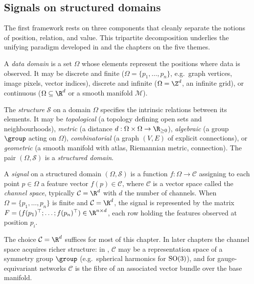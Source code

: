 \subsection{Signals on structured domains}
\label{sec:found:signals}

The first framework rests on three components that cleanly separate the notions
of position, relation, and value. This tripartite decomposition underlies the
unifying paradigm developed in  and the chapters on the five
themes.

\begin{definition}
\label{def:found:domain}
A \emph{data domain} is a set $\Omega$ whose elements represent the positions
where data is observed. It may be discrete and finite
($\Omega = \{p_1, \ldots, p_n\}$, e.g.\ graph vertices, image pixels, vector
indices), discrete and infinite ($\Omega = \Z^d$, an infinite grid), or
continuous ($\Omega \subseteq \R^d$ or a smooth manifold $\mathcal{M}$).
\end{definition}

\begin{definition}
\label{def:found:structure}
The \emph{structure} $\mathcal{S}$ on a domain $\Omega$ specifies the intrinsic
relations between its elements. It may be \emph{topological} (a topology defining
open sets and neighbourhoods), \emph{metric} (a distance
$d : \Omega \times \Omega \to \R_{\ge 0}$), \emph{algebraic} (a group $\group$
acting on $\Omega$), \emph{combinatorial} (a graph $(V,E)$ of explicit
connections), or \emph{geometric} (a smooth manifold with atlas, Riemannian
metric, connection). The pair $(\Omega, \mathcal{S})$ is a \emph{structured
domain}.
\end{definition}

\begin{definition}[Signal]
\label{def:found:signal}
A \emph{signal} on a structured domain $(\Omega, \mathcal{S})$ is a function
$f : \Omega \to \mathcal{C}$ assigning to each point $p \in \Omega$ a feature
vector $f(p) \in \mathcal{C}$, where $\mathcal{C}$ is a vector space called the
\emph{channel space}, typically $\mathcal{C} = \R^d$ with $d$ the number of
channels. When $\Omega = \{p_1, \ldots, p_n\}$ is finite and
$\mathcal{C} = \R^d$, the signal is represented by the matrix
$F = (f(p_1)^\top; \ldots; f(p_n)^\top) \in \R^{n \times d}$, each row holding
the features observed at position $p_i$.
\end{definition}

\begin{remark}
\label{rem:found:channels}
The choice $\mathcal{C} = \R^d$ suffices for most of this chapter. In later
chapters the channel space acquires richer structure: in
, $\mathcal{C}$ may be a representation space of a symmetry group
$\group$ (e.g.\ spherical harmonics for $\operatorname{SO}(3)$), and for gauge-equivariant
networks $\mathcal{C}$ is the fibre of an associated vector bundle over the base
manifold.
\end{remark}


